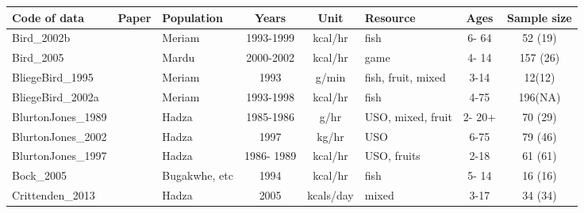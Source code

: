 \begin{landscape}
\begin{longtable}{M{2.6cm} M{3.6cm} M{1.5cm} c c M{1cm} c c}
\hline
{} 
Code of data                  & Paper                                     & Population      & Years      & Unit      & Resource           & Ages    & Sample size \\ \hline
\endfirsthead
%
\endhead
%
Bird\_2002b                    & \cite{bird_children_2002}                 & Meriam          & 1993-1999  & kcal/hr   & fish               & 6- 64   & 52 (19)     \\
Bird\_2005                     & \cite{bird_mardu_2005}                    & Mardu           & 2000-2002  & kcal/hr   & game               & 4- 14   & 157 (26)    \\
BliegeBird\_1995               & \cite{bird_children_1995}                 & Meriam          & 1993       & g/min     & fish, fruit, mixed & 3-14    & 12(12)      \\
BliegeBird\_2002a              & \cite{bird_constraints_2002}              & Meriam          & 1993-1998  & kcal/hr   & fish               & 4-75    & 196(NA)     \\
BlurtonJones\_1989             & \cite{blurton_jones_modelling_1989}       & Hadza           & 1985-1986  & g/hr      & USO, mixed, fruit  & 2- 20+  & 70 (29)     \\
BlurtonJones\_2002             & \cite{blurton_jones_selection_2002}       & Hadza           & 1997       & kg/hr     & USO                & 6-75    & 79 (46)     \\
BlurtonJones\_1997             & \cite{blurton_jones_why_1997}             & Hadza           & 1986- 1989 & kcal/hr   & USO, fruits        & 2-18    & 61 (61)     \\
Bock\_2005                     & \cite{bock_what_2005}                     & Bugakwhe, etc & 1994       & kcal/hr   & fish               & 5- 14   & 16 (16)     \\
Crittenden\_2013               & \cite{crittenden_juvenile_2013}           & Hadza           & 2005       & kcals/day & mixed              & 3-17    & 34 (34)     \\

\end{longtable}
\end{landscape}
